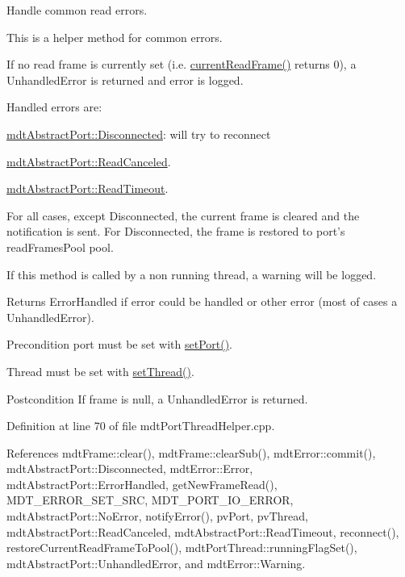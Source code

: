 Handle common read errors. 

This is a helper method for common errors.

If no read frame is currently set (i.\-e. \hyperlink{classmdt_port_thread_helper_a36445798b093f4e7463c353677d816d5}{current\-Read\-Frame()} returns 0), a Unhandled\-Error is returned and error is logged.

Handled errors are\-:
\begin{DoxyItemize}
\item \hyperlink{classmdt_abstract_port_ad4121bb930c95887e77f8bafa065a85ea8b70726d03f75a691ac4ad65722a5f3c}{mdt\-Abstract\-Port\-::\-Disconnected}\-: will try to reconnect
\item \hyperlink{classmdt_abstract_port_ad4121bb930c95887e77f8bafa065a85eac910ca649b9eaa64e290be41945a61dc}{mdt\-Abstract\-Port\-::\-Read\-Canceled}.
\item \hyperlink{classmdt_abstract_port_ad4121bb930c95887e77f8bafa065a85ea487558758ab0d582d6cf497a785e40c5}{mdt\-Abstract\-Port\-::\-Read\-Timeout}.
\end{DoxyItemize}

For all cases, except Disconnected, the current frame is cleared and the notification is sent. For Disconnected, the frame is restored to port's read\-Frames\-Pool pool.

If this method is called by a non running thread, a warning will be logged.

\begin{DoxyReturn}{Returns}
Error\-Handled if error could be handled or other error (most of cases a Unhandled\-Error). 
\end{DoxyReturn}
\begin{DoxyPrecond}{Precondition}
port must be set with \hyperlink{classmdt_port_thread_helper_a4127c0b28dc63df06b5a36a4be8b3bb7}{set\-Port()}. 

Thread must be set with \hyperlink{classmdt_port_thread_helper_af6c9d2cb2e9e922942236068bf634b0b}{set\-Thread()}. 
\end{DoxyPrecond}
\begin{DoxyPostcond}{Postcondition}
If frame is null, a Unhandled\-Error is returned. 
\end{DoxyPostcond}


Definition at line 70 of file mdt\-Port\-Thread\-Helper.\-cpp.



References mdt\-Frame\-::clear(), mdt\-Frame\-::clear\-Sub(), mdt\-Error\-::commit(), mdt\-Abstract\-Port\-::\-Disconnected, mdt\-Error\-::\-Error, mdt\-Abstract\-Port\-::\-Error\-Handled, get\-New\-Frame\-Read(), M\-D\-T\-\_\-\-E\-R\-R\-O\-R\-\_\-\-S\-E\-T\-\_\-\-S\-R\-C, M\-D\-T\-\_\-\-P\-O\-R\-T\-\_\-\-I\-O\-\_\-\-E\-R\-R\-O\-R, mdt\-Abstract\-Port\-::\-No\-Error, notify\-Error(), pv\-Port, pv\-Thread, mdt\-Abstract\-Port\-::\-Read\-Canceled, mdt\-Abstract\-Port\-::\-Read\-Timeout, reconnect(), restore\-Current\-Read\-Frame\-To\-Pool(), mdt\-Port\-Thread\-::running\-Flag\-Set(), mdt\-Abstract\-Port\-::\-Unhandled\-Error, and mdt\-Error\-::\-Warning.



